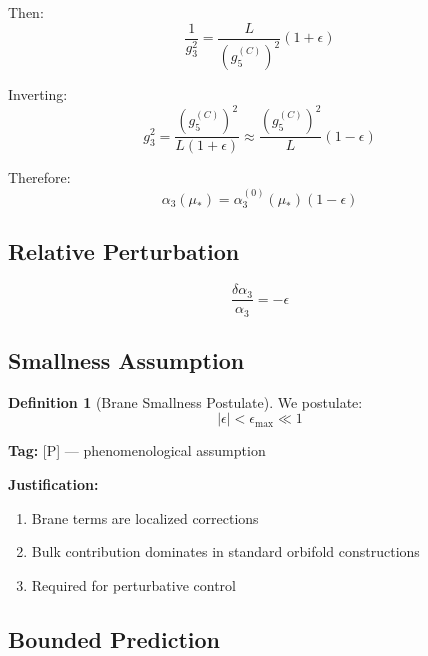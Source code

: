 \documentclass[11pt,a4paper]{article}
\theoremstyle{definition}
\newtheorem{definition}{Definition}[section]
\begin{document}
Then:
\begin{equation}
\label{eq:perturbed-matching}
\frac{1}{g_3^2} = \frac{L}{(g_5^{(C)})^2}(1 + \epsilon)
\end{equation}

Inverting:
\begin{equation}
\label{eq:perturbed-g3}
g_3^2 = \frac{(g_5^{(C)})^2}{L(1+\epsilon)} \approx \frac{(g_5^{(C)})^2}{L}(1-\epsilon)
\end{equation}

Therefore:
\begin{equation}
\label{eq:perturbed-alpha3}
\alpha_3(\mu_*) = \alpha_3^{(0)}(\mu_*)(1-\epsilon)
\end{equation}

\subsection{Relative Perturbation}
\label{subsec:relative}

\begin{equation}
\label{eq:relative-pert}
\frac{\delta\alpha_3}{\alpha_3} = -\epsilon
\end{equation}

\subsection{Smallness Assumption}
\label{subsec:smallness}

\begin{definition}[Brane Smallness Postulate]
\label{def:brane-smallness}
We postulate:
\begin{equation}
\label{eq:eps-bound}
|\epsilon| < \epsilon_{\max} \ll 1
\end{equation}
\end{definition}

\textbf{Tag:} [P] --- phenomenological assumption

\textbf{Justification:}
\begin{enumerate}
  \item Brane terms are localized corrections
  \item Bulk contribution dominates in standard orbifold constructions
  \item Required for perturbative control
\end{enumerate}

\subsection{Bounded Prediction}
\label{subsec:bounded}
\end{document}
